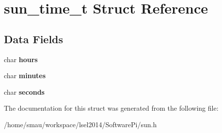 \hypertarget{structsun__time__t}{\section{sun\-\_\-time\-\_\-t Struct Reference}
\label{structsun__time__t}
}
\subsection*{Data Fields}
\begin{DoxyCompactItemize}
\item 
\hypertarget{structsun__time__t_a4808e755b307f73adaf60447b23bcd52}{char {\bfseries hours}}\label{structsun__time__t_a4808e755b307f73adaf60447b23bcd52}

\item 
\hypertarget{structsun__time__t_a3e1f7cc25686f64a1f0a2a69a213103a}{char {\bfseries minutes}}\label{structsun__time__t_a3e1f7cc25686f64a1f0a2a69a213103a}

\item 
\hypertarget{structsun__time__t_a4b049a3caf70550985bc26ff04efa078}{char {\bfseries seconds}}\label{structsun__time__t_a4b049a3caf70550985bc26ff04efa078}

\end{DoxyCompactItemize}


The documentation for this struct was generated from the following file\-:\begin{DoxyCompactItemize}
\item 
/home/smau/workspace/lsel2014/\-Software\-Pi/sun.\-h\end{DoxyCompactItemize}
